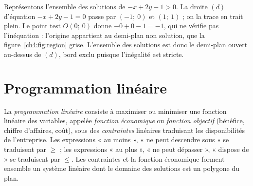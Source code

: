 \begin{center}
\label{ch4:fig:region}
\end{center}

\begin{exemple}
Représentons l'ensemble des solutions de $-x + 2y - 1 > 0$. La droite $(d)$ d'équation $-x + 2y - 1 = 0$ passe par $(-1;\ 0)$ et $(1;\ 1)$ ; on la trace en trait plein. Le point test $O(0;\ 0)$ donne $-0 + 0 - 1 = -1$, qui ne vérifie pas l'inéquation : l'origine appartient au demi-plan non solution, que la figure~\ref{ch4:fig:region} grise. L'ensemble des solutions est donc le demi-plan ouvert au-dessus de $(d)$, bord exclu puisque l'inégalité est stricte.
\end{exemple}

\section{Programmation linéaire}

\begin{definition}
La \emph{programmation linéaire} consiste à maximiser ou minimiser une fonction linéaire des variables, appelée \emph{fonction économique} ou \emph{fonction objectif} (bénéfice, chiffre d'affaires, coût), sous des \emph{contraintes} linéaires traduisant les disponibilités de l'entreprise. Les expressions « au moins », « ne peut descendre sous » se traduisent par $\geqslant$ ; les expressions « au plus », « ne peut dépasser », « dispose de » se traduisent par $\leqslant$. Les contraintes et la fonction économique forment ensemble un système linéaire dont le domaine des solutions est un polygone du plan.
\end{definition}

